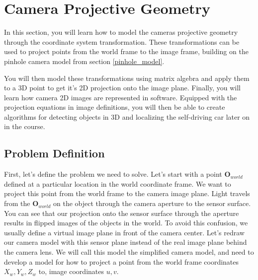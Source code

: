 \section{Camera Projective Geometry}
\label{camera_projective_geometry}

In this section, you will learn how to model the cameras projective geometry through the coordinate
system transformation. These transformations can
be used to project points from the world frame
to the image frame, building on the pinhole
camera model from section \ref{pinhole_model}.

You will then model
these transformations using matrix algebra and apply them to a 3D point to get it's 2D projection
onto the image plane. Finally, you will learn how camera 2D images are
represented in software. Equipped with the projection equations in image definitions, 
you will then be able to create algorithms for detecting objects in 3D and localizing
the self-driving car later on in the course. 

\subsection{Problem Definition}
\label{camera_projective_geometry_problem_definition}

First, let's define
the problem we need to solve. Let's start with a
point $\mathbf{O}_{world}$ defined at a particular location in
the world coordinate frame. We want to project
this point from the world frame to
the camera image plane. Light travels from
the $\mathbf{O}_{world}$ on the object through the camera aperture
to the sensor surface. You can see that our projection onto the sensor surface through the aperture results in flipped images of
the objects in the world. To avoid this confusion, we usually define
a virtual image plane in front of the camera center. Let's redraw our camera model
with this sensor plane instead of the real image
plane behind the camera lens. We will call this model the
simplified camera model, and need to develop
a model for how to project a point from the world
frame coordinates $X_{w}, Y_{w}, Z_{w}$ to, image coordinates $u, v$. 

